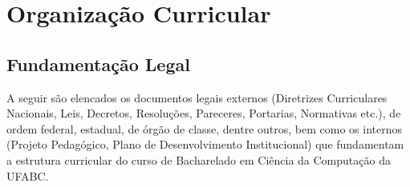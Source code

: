 \documentclass{article}
\begin{document}
\newpage

\tableofcontents

\newpage


\newpage


\newpage


\newpage


\newpage


\newpage


\newpage






\newpage
\section {Organização Curricular}

\subsection{Fundamentação Legal}

A seguir são elencados os documentos legais externos (Diretrizes Curriculares Nacionais, Leis, Decretos, Resoluções, Pareceres, Portarias, Normativas etc.), de ordem federal, estadual, de órgão de classe, dentre outros, bem como os internos (Projeto Pedagógico, Plano de Desenvolvimento Institucional) que fundamentam a estrutura curricular do curso de
Bacharelado em Ciência da Computação da UFABC.
\end{document}
